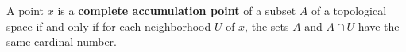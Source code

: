 A point $x$ is a \textbf{complete accumulation point} of a subset $A$ of a topological space if and only if for each neighborhood $U$ of $x$, the sets $A$ and $A \cap U$ have the same cardinal number.
